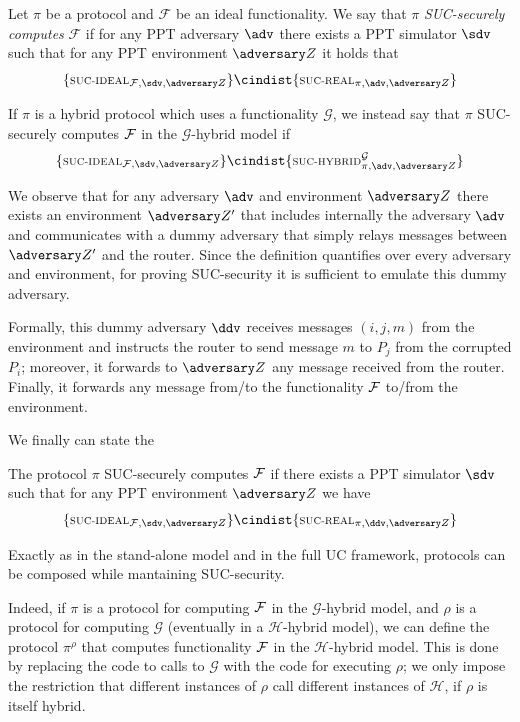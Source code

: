 \begin{definition}
    Let $\pi$ be a protocol and $\mathcal F$ be an ideal functionality. We say that $\pi$ \emph{SUC-securely computes} $\mathcal F$ if for any PPT adversary $\adv$ there exists a PPT simulator $\sdv$ such that for any PPT environment $\zdv$ it holds that
    $$ \{ \textsc{\scriptsize SUC-IDEAL}_{\Fun, \sdv, \zdv} \} \cindist \{ \textsc{\scriptsize SUC-REAL}_{\pi, \adv, \zdv} \}$$
    
    If $\pi$ is a hybrid protocol which uses a functionality $\mathcal G$, we instead say that $\pi$ SUC-securely computes $\mathcal{F}$ in the $\mathcal G$-hybrid model if
    $$ \{ \textsc{\scriptsize SUC-IDEAL}_{\Fun, \sdv, \zdv} \} \cindist \{ \textsc{\scriptsize SUC-HYBRID}^{\mathcal G}_{\pi, \adv, \zdv} \}$$
\end{definition}

We observe that for any adversary $\adv$ and environment $\zdv$ there exists an environment $\zdv'$ that includes internally the adversary $\adv$ and communicates with a dummy adversary that simply relays messages between $\zdv'$ and the router. Since the definition quantifies over every adversary and environment, for proving SUC-security it is sufficient to emulate this dummy adversary.

Formally, this dummy adversary $\ddv$ receives messages $(i,j,m)$ from the environment and instructs the router to send message $m$ to $P_j$ from the corrupted $P_i$; moreover, it forwards to $\zdv$ any message received from the router. Finally, it forwards any message from/to the functionality $\mathcal{F}$ to/from the environment.

We finally can state the
\begin{proposition}
    The protocol $\pi$ SUC-securely computes $\mathcal{F}$ if there exists a PPT simulator $\sdv$ such that for any PPT environment $\zdv$ we have 
    $$ \{ \textsc{\scriptsize SUC-IDEAL}_{\Fun, \sdv, \zdv} \} \cindist \{ \textsc{\scriptsize SUC-REAL}_{\pi, \ddv, \zdv} \}$$
\end{proposition}

Exactly as in the stand-alone model and in the full UC framework, protocols can be composed while mantaining SUC-security.

Indeed, if $\pi$ is a protocol for computing $\mathcal{F}$ in the $\mathcal G$-hybrid model, and $\rho$ is a protocol for computing $\mathcal G$ (eventually in a $\mathcal H$-hybrid model), we can define the protocol $\pi^\rho$ that computes functionality $\mathcal{F}$ in the $\mathcal H$-hybrid model. This is done by replacing the code to calls to $\mathcal G$ with the code for executing $\rho$; we only impose the restriction that different instances of $\rho$ call different instances of $\mathcal H$, if $\rho$ is itself hybrid.

